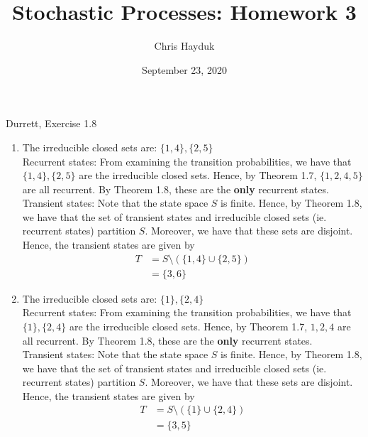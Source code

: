 \documentclass[12pt]{article}
\newenvironment{problem}[2][Problem]{\begin{trivlist}
\item[\hskip \labelsep {\bfseries #1}\hskip \labelsep {\bfseries #2.}]}{\end{trivlist}}
\begin{document}
\title{Stochastic Processes: Homework 3}

\author{Chris Hayduk}
\date{September 23, 2020}

\maketitle

\begin{problem}{1}
Durrett, Exercise 1.8
\end{problem}

\begin{enumerate}[label=(\alph*), start=4]
\item The irreducible closed sets are: $\{1, 4\}, \{2, 5\}$\\

Recurrent states: From examining the transition probabilities, we have that $\{1, 4\}, \{2, 5\}$ are the irreducible closed sets. Hence, by Theorem 1.7, $\{1, 2, 4, 5\}$ are all recurrent. By Theorem 1.8, these are the \textbf{only} recurrent states.\\

Transient states: Note that the state space $S$ is finite. Hence, by Theorem 1.8, we have that the set of transient states and irreducible closed sets (ie. recurrent states) partition $S$. Moreover, we have that these sets are disjoint. Hence, the transient states are given by
\begin{align*}
T &= S \setminus (\{1, 4\} \cup \{2, 5\})\\
&= \{3, 6\}
\end{align*}

\item The irreducible closed sets are: $\{1\}, \{2, 4\}$\\

Recurrent states: From examining the transition probabilities, we have that $\{1\}, \{2, 4\}$ are the irreducible closed sets. Hence, by Theorem 1.7, $1, 2, 4$ are all recurrent. By Theorem 1.8, these are the \textbf{only} recurrent states.\\

Transient states: Note that the state space $S$ is finite. Hence, by Theorem 1.8, we have that the set of transient states and irreducible closed sets (ie. recurrent states) partition $S$. Moreover, we have that these sets are disjoint. Hence, the transient states are given by
\begin{align*}
T &= S \setminus (\{1\} \cup \{2, 4\})\\
&= \{3, 5\}
\end{align*}
\end{enumerate}
\end{document}
